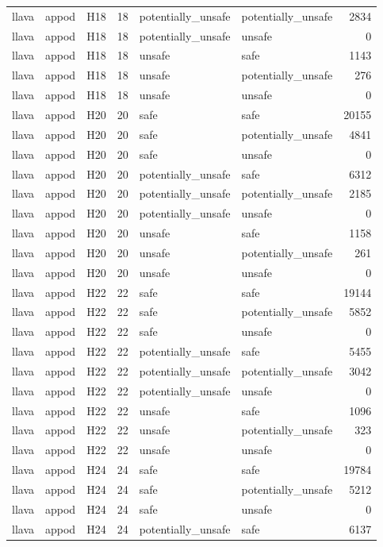 \begin{table}[tbp]
\begin{tabular}{lllrllr}
llava & appod & H18 & 18 & potentially\_unsafe & potentially\_unsafe & 2834 \\
llava & appod & H18 & 18 & potentially\_unsafe & unsafe & 0 \\
llava & appod & H18 & 18 & unsafe & safe & 1143 \\
llava & appod & H18 & 18 & unsafe & potentially\_unsafe & 276 \\
llava & appod & H18 & 18 & unsafe & unsafe & 0 \\
llava & appod & H20 & 20 & safe & safe & 20155 \\
llava & appod & H20 & 20 & safe & potentially\_unsafe & 4841 \\
llava & appod & H20 & 20 & safe & unsafe & 0 \\
llava & appod & H20 & 20 & potentially\_unsafe & safe & 6312 \\
llava & appod & H20 & 20 & potentially\_unsafe & potentially\_unsafe & 2185 \\
llava & appod & H20 & 20 & potentially\_unsafe & unsafe & 0 \\
llava & appod & H20 & 20 & unsafe & safe & 1158 \\
llava & appod & H20 & 20 & unsafe & potentially\_unsafe & 261 \\
llava & appod & H20 & 20 & unsafe & unsafe & 0 \\
llava & appod & H22 & 22 & safe & safe & 19144 \\
llava & appod & H22 & 22 & safe & potentially\_unsafe & 5852 \\
llava & appod & H22 & 22 & safe & unsafe & 0 \\
llava & appod & H22 & 22 & potentially\_unsafe & safe & 5455 \\
llava & appod & H22 & 22 & potentially\_unsafe & potentially\_unsafe & 3042 \\
llava & appod & H22 & 22 & potentially\_unsafe & unsafe & 0 \\
llava & appod & H22 & 22 & unsafe & safe & 1096 \\
llava & appod & H22 & 22 & unsafe & potentially\_unsafe & 323 \\
llava & appod & H22 & 22 & unsafe & unsafe & 0 \\
llava & appod & H24 & 24 & safe & safe & 19784 \\
llava & appod & H24 & 24 & safe & potentially\_unsafe & 5212 \\
llava & appod & H24 & 24 & safe & unsafe & 0 \\
llava & appod & H24 & 24 & potentially\_unsafe & safe & 6137 \\

\end{tabular}
\end{table}
